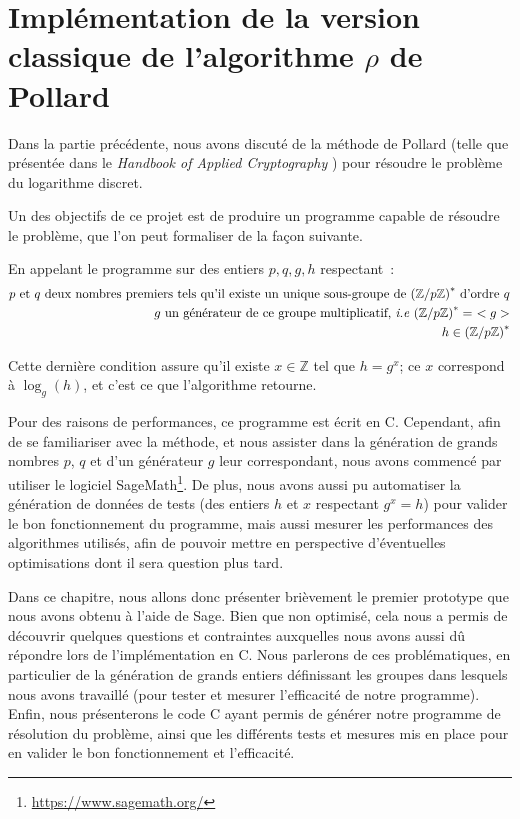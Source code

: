 \chapter{Implémentation de la version classique de l'algorithme \texorpdfstring{$\rho$}{Rho} de Pollard}
    Dans la partie précédente, nous avons discuté de la méthode de Pollard (telle que présentée dans le \textit{Handbook of Applied Cryptography} \autocite[106]{handbook}) pour résoudre le problème du logarithme discret.

    Un des objectifs de ce projet est de produire un programme capable de résoudre le problème, que l'on peut formaliser de la façon suivante.

    En appelant le programme sur des entiers $p, q, g, h$ respectant~:
    \begin{equation} \label{eq:2}
      \begin{split}
        p \text{\ et } q \text{\ deux nombres premiers tels qu'il existe un unique sous-groupe de } {(\mathbb{Z}/p\mathbb{Z})}^* \text{\ d'ordre } q \\
        g \text{\ un générateur de ce groupe multiplicatif, \textit{i.e} } {(\mathbb{Z}/p\mathbb{Z})}^* =\ < g > \\
        h \in {(\mathbb{Z}/p\mathbb{Z})}^*
      \end{split}
    \end{equation}

    Cette dernière condition assure qu'il existe $x \in \mathbb{Z}$ tel que $h = g^x$; ce $x$ correspond à $\log_g(h)$, et c'est ce que l'algorithme retourne.

    Pour des raisons de performances, ce programme est écrit en C.
    Cependant, afin de se familiariser avec la méthode, et nous assister dans la génération de grands nombres $p$, $q$ et d'un générateur $g$ leur correspondant, nous avons commencé par utiliser le logiciel SageMath\footnote{\url{https://www.sagemath.org/}}. De plus, nous avons aussi pu automatiser la génération de données de tests (des entiers $h$ et $x$ respectant $g^x = h$) pour valider le bon fonctionnement du programme, mais aussi mesurer les performances des algorithmes utilisés, afin de pouvoir mettre en perspective d'éventuelles optimisations dont il sera question plus tard.

    Dans ce chapitre, nous allons donc présenter brièvement le premier prototype que nous avons obtenu à l'aide de Sage.
    Bien que non optimisé, cela nous a permis de découvrir quelques questions et contraintes auxquelles nous avons aussi dû répondre lors de l'implémentation en C.
    Nous parlerons de ces problématiques, en particulier de la génération de grands entiers définissant les groupes dans lesquels nous avons travaillé (pour tester et mesurer l'efficacité de notre programme).
    Enfin, nous présenterons le code C ayant permis de générer notre programme de résolution du problème, ainsi que les différents tests et mesures mis en place pour en valider le bon fonctionnement et l'efficacité.


